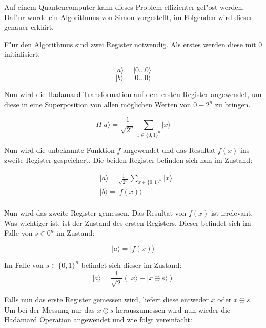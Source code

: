 \begin{refsection}
Auf einem Quantencomputer kann dieses Problem effizienter gel"ost werden.
Daf"ur wurde ein Algorithmus von Simon vorgestellt, im Folgenden wird dieser
genauer erklärt.


F"ur den Algorithmus sind zwei Register notwendig. Als erstes werden diese mit
0 initialisiert.

\[ 
    |a\rangle=|0 ... 0 \rangle 
\]
\[
    |b\rangle=|0 ... 0 \rangle 
\]

Nun wird die Hadamard-Transformation auf dem ersten Register
angewendet, um diese in eine Superposition von allen möglichen Werten von $0
- 2^n$ zu bringen.

\[ 
    H|a\rangle=\frac{1}{\sqrt{2^n}} \sum_{x\in\{0,1\}^n}{|x\rangle}
\]
 
Nun wird die unbekannte Funktion $f$ angewendet und das Resultat $f(x)$ ins
zweite Register gespeichert. Die beiden Register befinden sich nun im Zustand:

\begin{align*}
  & |a\rangle = \frac{1}{\sqrt{2^n}} \sum_{x\in\{0,1\}^n} {|x\rangle} \\
  & |b\rangle = |f(x)\rangle \\
\end{align*}

Nun wird das zweite Register gemessen. Das Resultat von $f(x)$ ist irrelevant.
Was wichtiger ist, ist der Zustand des ersten Registers.  Dieser befindet sich
im Falle von $s\in0^n$ im Zustand:

\[
    |a\rangle = |f(x)\rangle
\]

Im Falle von $s \in \{0,1\}^n$ befindet sich dieser im Zustand:
\[
    |a\rangle = \frac{1}{\sqrt{2}} ( |x\rangle + |x \oplus s \rangle )
\]

Falls nun das erste Register gemessen wird, liefert diese entweder $x$ oder $x
\oplus s$. Um bei der Messung nur das $x \oplus s$ herauszumessen wird nun
wieder die Hadamard Operation angewendet und wie folgt vereinfacht:


\end{refsection}
